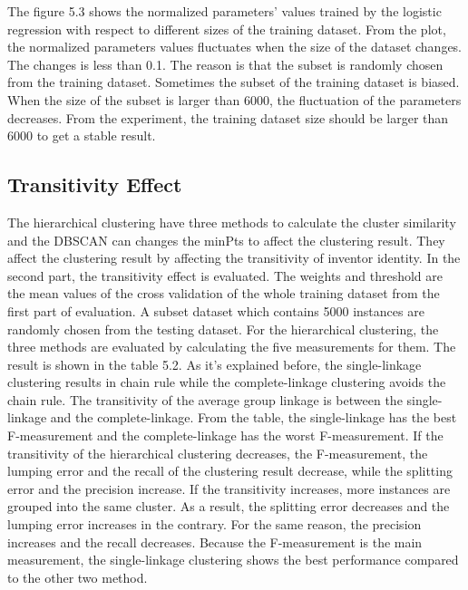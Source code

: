 The figure 5.3 shows the normalized parameters' values trained by the logistic regression with respect to different sizes of the training dataset. From the plot, the normalized parameters values  fluctuates when the size of the dataset changes. The changes is less than 0.1. The reason is that the subset is randomly chosen from the training dataset. Sometimes the subset of the training dataset is biased. When the size of the subset is larger than 6000, the fluctuation of the parameters decreases. From the experiment, the training dataset size should be larger than 6000 to get a stable result.

\subsection{Transitivity Effect}
The hierarchical clustering have three methods to calculate the cluster similarity and the DBSCAN can changes the minPts to affect the clustering result. They affect the clustering result by affecting the transitivity of inventor identity. In the second part, the transitivity effect is evaluated. The weights and threshold are the mean values of the cross validation of the whole training dataset from the first part of evaluation. A subset dataset which contains 5000 instances are randomly chosen from the testing dataset. For the hierarchical clustering, the three methods are evaluated by calculating the five measurements for them. The result is shown in the table 5.2. As it's explained before, the single-linkage clustering results in chain rule while the complete-linkage clustering avoids the chain rule. The transitivity of the average group linkage is between the single-linkage and the complete-linkage. From the table, the single-linkage has the best F-measurement and the complete-linkage has the worst F-measurement.  If the transitivity of the hierarchical clustering decreases, the F-measurement, the lumping error and the recall of the clustering result decrease, while the splitting error and the precision increase. If the transitivity increases, more instances are grouped into the same cluster. As a result, the splitting error decreases and the lumping error increases in the contrary. For the same reason, the precision increases and the recall decreases. Because the F-measurement is the main measurement, the single-linkage clustering shows the best performance compared to the other two method.

